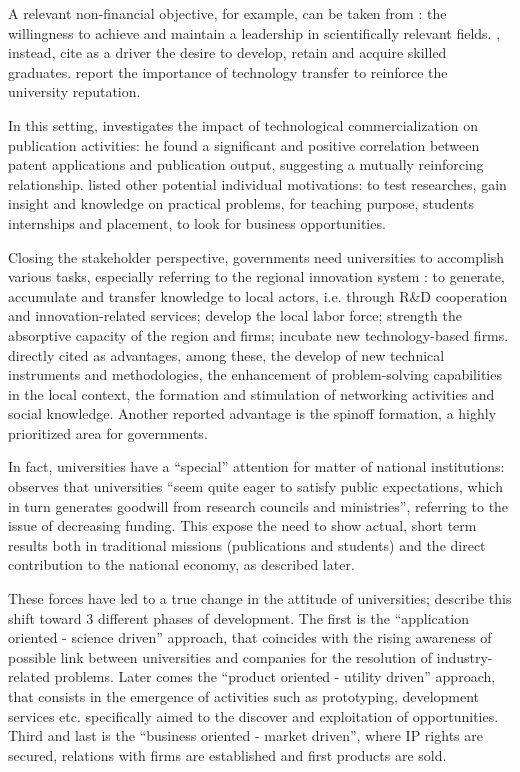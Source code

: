 A relevant non-financial objective, for example, can be taken from \citet{Tijssen2006}: the willingness to achieve and maintain a leadership in scientifically relevant fields. \citet{Leitch2005}, instead, cite as a driver the desire to develop, retain and acquire skilled graduates. \citet{Baldini2006} report the importance of technology transfer to reinforce the university reputation. 

In this setting, \citet{Wong2010} investigates the impact of technological commercialization on publication activities: he found a significant and positive correlation between patent applications and publication output, suggesting a mutually reinforcing relationship. \citet{Lee2000} listed other potential individual motivations: to test researches, gain insight and knowledge on practical problems, for teaching purpose, students internships and placement, to look for business opportunities. 

Closing the stakeholder perspective, governments need universities to accomplish various tasks, especially referring to the regional innovation system \citep{Fritsch2007,Balderi2007}: to generate, accumulate and transfer knowledge to local actors, i.e. through R\&D cooperation and innovation-related services; develop the local labor force; strength the absorptive capacity of the region and firms; incubate new technology-based firms. \citet{AzagraCaro2010} directly cited as advantages, among these, the develop of new technical instruments and methodologies, the enhancement of problem-solving capabilities in the local context, the formation and stimulation of networking activities and social knowledge. Another reported advantage is the spinoff formation, a highly prioritized area for governments.

In fact, universities have a \enquote{special} attention for matter of national institutions: \citet{Rasmussen2006} observes that universities \enquote{seem quite eager to satisfy public expectations, which in turn generates goodwill from research councils and ministries}, referring to the issue of decreasing funding. This expose the need to show actual, short term results both in traditional missions (publications and students) and the direct contribution to the national economy, as described later.

These forces have led to a true change in the attitude of universities; \citet{Tijssen2006} describe this shift toward 3 different phases of development. The first is the \enquote{application oriented - science driven} approach, that coincides with the rising awareness of possible link between universities and companies for the resolution of industry-related problems. Later comes the \enquote{product oriented - utility driven} approach, that consists in the emergence of activities such as prototyping, development services etc. specifically aimed to the discover and exploitation of opportunities. Third and last is the \enquote{business oriented - market driven}, where IP rights are secured, relations with firms are established and first products are sold.


